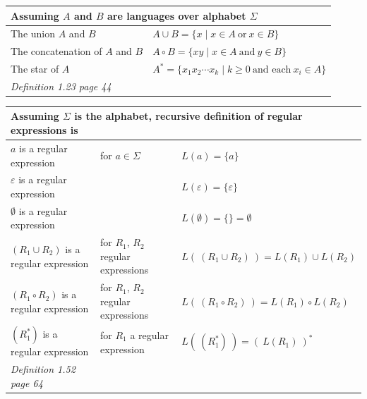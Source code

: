 \documentclass[12pt, oneside]{article}
\begin{document}
    \begin{center}
    \begin{tabular}{|ll|}
    \hline
    \multicolumn{2}{|l|}{Assuming $A$ and $B$  are languages  over alphabet $\Sigma$}\\
    \hline
    The union $A$ and $B$   & $A \cup B = \{  x \mid x \in A~\text{or}~x  \in  B \}$ \\
    The concatenation of $A$ and $B$   & $A \circ B = \{  xy \mid x \in A~\text{and}~y  \in  B \} $ \\
    The star of $A$ & $A^* = \{ x_1 x_2 \cdots  x_k \mid k  \geq 0 ~\text{and each}~x_i \in A \}$ \\
    \hline
    {\it Definition 1.23 page 44} & \\
    \hline
    \end{tabular}
    \end{center}
    
    
    
    \begin{center}
    \begin{tabular}{|lll|}
    \hline
    \multicolumn{3}{|l|}{Assuming $\Sigma$ is the alphabet, recursive definition of regular expressions is}\\
    \hline
    $a$ is a regular expression  & for $a \in \Sigma$ & $L(a) = \{a\}$ \\
    $\varepsilon$ is a regular expression   & & $L(\varepsilon) = \{ \varepsilon \}$ \\
    $\emptyset$ is a regular expression  & & $L(\emptyset) = \{\} =  \emptyset$ \\
    $(R_1 \cup R_2)$ is a regular expression & for  $R_1$, $R_2$ regular expressions & 
    $L( ~(R_1\cup R_2) ~)  =
    L(R_1) \cup L(R_2)$ \\
    $(R_1 \circ R_2)$ is a regular expression & for  $R_1$, $R_2$ regular expressions & 
    $L( ~(R_1\circ R_2) ~)  =
    L(R_1) \circ L(R_2)$ \\
    $(R_1^*)$ is a regular expression & for  $R_1$ a regular expression & $L( ~(R_1^*) ~)  = (~L(R_1) ~)^*$ \\
    \hline
    {\it Definition 1.52 page 64} & & \\
    \hline
    \end{tabular}
    \end{center}
    
\end{document}
